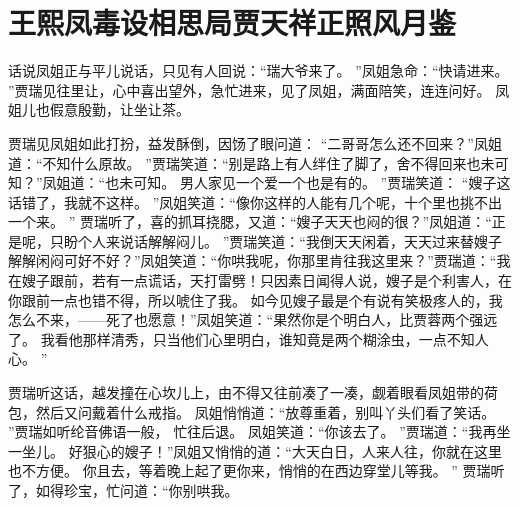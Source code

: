 \chapter{王熙凤毒设相思局\quad 贾天祥正照风月鉴}
\par
话说凤姐正与平儿说话，只见有人回说：“瑞大爷来了。
”凤姐急命：“快请进来。
”贾瑞见往里让，心中喜出望外，急忙进来，见了凤姐，满面陪笑，连连问好。
凤姐儿也假意殷勤，让坐让茶。
\par
贾瑞见凤姐如此打扮，益发酥倒，因饧了眼问道：
“二哥哥怎么还不回来？”凤姐道：“不知什么原故。
”贾瑞笑道：“别是路上有人绊住了脚了，舍不得回来也未可知？”凤姐道：“也未可知。
男人家见一个爱一个也是有的。
”贾瑞笑道：
“嫂子这话错了，我就不这样。
”凤姐笑道：“像你这样的人能有几个呢，十个里也挑不出一个来。
”
贾瑞听了，喜的抓耳挠腮，又道：“嫂子天天也闷的很？”凤姐道：“正是呢，只盼个人来说话解解闷儿。
”贾瑞笑道：“我倒天天闲着，天天过来替嫂子解解闲闷可好不好？”凤姐笑道：“你哄我呢，你那里肯往我这里来？”贾瑞道：“我在嫂子跟前，若有一点谎话，天打雷劈！只因素日闻得人说，嫂子是个利害人，在你跟前一点也错不得，所以唬住了我。
如今见嫂子最是个有说有笑极疼人的，我怎么不来，——死了也愿意！”凤姐笑道：“果然你是个明白人，比贾蓉两个强远了。
我看他那样清秀，只当他们心里明白，谁知竟是两个糊涂虫，一点不知人心。
”\par
贾瑞听这话，越发撞在心坎儿上，由不得又往前凑了一凑，觑着眼看凤姐带的荷包，然后又问戴着什么戒指。
凤姐悄悄道：“放尊重着，别叫丫头们看了笑话。
”贾瑞如听纶音佛语一般，
忙往后退。
凤姐笑道：“你该去了。
”贾瑞道：“我再坐一坐儿。
好狠心的嫂子！”凤姐又悄悄的道：“大天白日，人来人往，你就在这里也不方便。
你且去，等着晚上起了更你来，悄悄的在西边穿堂儿等我。
”
贾瑞听了，如得珍宝，忙问道：“你别哄我。
